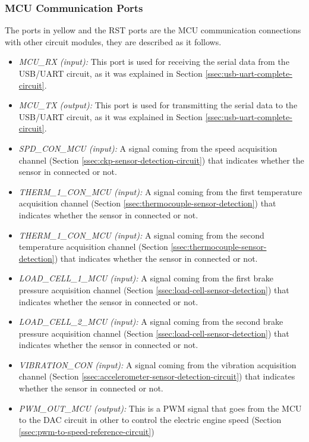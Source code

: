 			\subsubsection{MCU Communication Ports}\label{sssec:mcu-com-ports}
				The ports in yellow and the RST ports are the MCU communication connections with other circuit modules, they are described as it follows.

				\begin{itemize}
					\item \textit{MCU_RX (input):} This port is used for receiving the serial data from the USB/UART circuit, as it was explained in Section \ref{ssec:usb-uart-complete-circuit}.
					\item \textit{MCU_TX (output):} This port is used for transmitting the serial data to the USB/UART circuit, as it was explained in Section \ref{ssec:usb-uart-complete-circuit}. 
					\item \textit{SPD_CON_MCU (input):} A signal coming from the speed acquisition channel (Section \ref{ssec:ckp-sensor-detection-circuit}) that indicates whether the sensor in connected or not.
					\item \textit{THERM_1_CON_MCU (input):} A signal coming from the first temperature acquisition channel (Section \ref{ssec:thermocouple-sensor-detection}) that indicates whether the sensor in connected or not.
					\item \textit{THERM_1_CON_MCU (input):} A signal coming from the second temperature acquisition channel (Section \ref{ssec:thermocouple-sensor-detection}) that indicates whether the sensor in connected or not.
					\item \textit{LOAD_CELL_1_MCU (input):} A signal coming from the first brake pressure acquisition channel (Section \ref{ssec:load-cell-sensor-detection}) that indicates whether the sensor in connected or not.
					\item \textit{LOAD_CELL_2_MCU (input):} A signal coming from the second brake pressure acquisition channel (Section \ref{ssec:load-cell-sensor-detection}) that indicates whether the sensor in connected or not.
					\item \textit{VIBRATION_CON (input):} A signal coming from the vibration acquisition channel (Section \ref{ssec:accelerometer-sensor-detection-circuit}) that indicates whether the sensor in connected or not.
					\item \textit{PWM_OUT_MCU (output):} This is a PWM signal that goes from the MCU to the DAC circuit in other to control the electric engine speed (Section \ref{ssec:pwm-to-speed-reference-circuit}) 

\end{itemize}
